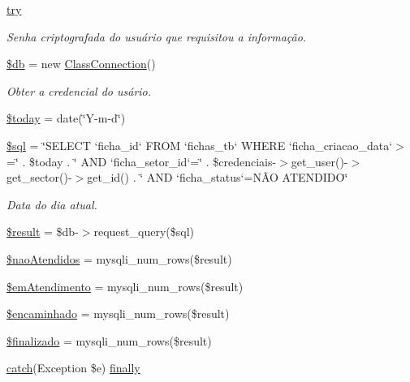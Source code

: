 \begin{DoxyCompactItemize}
\hyperlink{main_page_2inicial_2index_8php_abe4cc9788f52e49485473dc699537388}{try}
\begin{DoxyCompactList}\small\item\em Senha criptografada do usuário que requisitou a informação. \end{DoxyCompactList}\item 
\hyperlink{main_page_2inicial_2index_8php_a1fa3127fc82f96b1436d871ef02be319}{\$db} = new \hyperlink{class_class_connection}{Class\+Connection}()
\begin{DoxyCompactList}\small\item\em Obter a credencial do usário. \end{DoxyCompactList}\item 
\hyperlink{main_page_2inicial_2index_8php_af1b7fb9d06cdc6d22c14741fc3cc185a}{\$today} = date(\char`\"{}Y-\/m-\/d\char`\"{})
\item 
\hyperlink{main_page_2inicial_2index_8php_a047170d6020a882807665812a27e2525}{\$sql} = \char`\"{}S\+E\+L\+E\+CT `ficha\+\_\+id` F\+R\+OM `fichas\+\_\+tb` W\+H\+E\+RE `ficha\+\_\+criacao\+\_\+data`$>$=\textquotesingle{}\char`\"{} . \$today . \char`\"{}\textquotesingle{} A\+ND `ficha\+\_\+setor\+\_\+id`=\char`\"{} . \$credenciais-\/$>$get\+\_\+user()-\/$>$get\+\_\+sector()-\/$>$get\+\_\+id() . \char`\"{} A\+ND `ficha\+\_\+status`=\textquotesingle{}NÃO A\+T\+E\+N\+D\+I\+DO\textquotesingle{}\char`\"{}
\begin{DoxyCompactList}\small\item\em Data do dia atual. \end{DoxyCompactList}\item 
\hyperlink{main_page_2inicial_2index_8php_a112ef069ddc0454086e3d1e6d8d55d07}{\$result} = \$db-\/$>$request\+\_\+query(\$sql)
\item 
\hyperlink{main_page_2inicial_2index_8php_add4f57f5461e6bdecccd6d1fd7087cdf}{\$nao\+Atendidos} = mysqli\+\_\+num\+\_\+rows(\$result)
\item 
\hyperlink{main_page_2inicial_2index_8php_adc5ce818bd9a71cfd2370a6b9fec577c}{\$em\+Atendimento} = mysqli\+\_\+num\+\_\+rows(\$result)
\item 
\hyperlink{main_page_2inicial_2index_8php_a7eb9c8628fe0ebfde79ce1edcf149330}{\$encaminhado} = mysqli\+\_\+num\+\_\+rows(\$result)
\item 
\hyperlink{main_page_2inicial_2index_8php_a2587833f2f5a0d6fd7af021865381204}{\$finalizado} = mysqli\+\_\+num\+\_\+rows(\$result)
\item 
\hyperlink{imprimir_2ficha_2index_8php_a8104793004944f01dd070fc8b1ade3c4}{catch}(Exception \$e) \hyperlink{main_page_2inicial_2index_8php_a1eb47d68a4a4f73debf91b15e179d813}{finally}
\end{DoxyCompactItemize}


